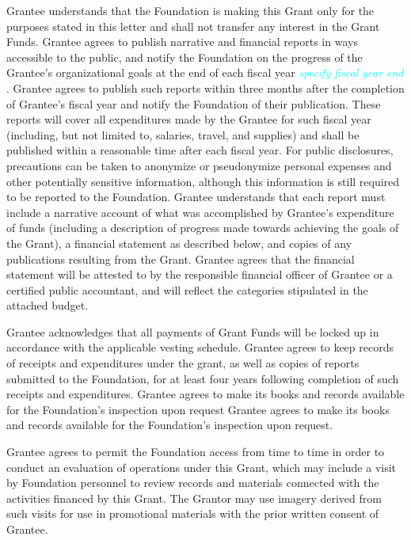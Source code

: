 \documentclass{article}
\begin{document}
Grantee understands that the Foundation is making this Grant only for the purposes stated in this letter and shall not transfer any interest in the Grant Funds. Grantee agrees to publish narrative and financial reports in ways accessible to the public, and notify the Foundation on the progress of the Grantee’s organizational goals at the end of each fiscal year \textcolor{cyan}{\emph{specify fiscal year end}} . Grantee agrees to publish such reports within three months after the completion of Grantee’s fiscal year and notify the Foundation of their publication.  These  reports will cover all expenditures made by the Grantee for such fiscal year (including, but not limited to, salaries, travel, and supplies) and shall be published within a reasonable time after each fiscal year. For public disclosures, precautions can be taken to anonymize or pseudonymize personal expenses and other potentially sensitive information, although this information is still required to be reported to the Foundation.  Grantee understands that each report must include a narrative account of what was accomplished by Grantee’s expenditure of funds (including a description of progress made towards achieving the goals of the Grant), a financial statement as described below, and copies of any publications resulting from the Grant. Grantee agrees that the financial statement will be attested to by the responsible financial officer of Grantee or a certified public accountant, and will reflect the categories stipulated in the attached budget. 
\par
Grantee acknowledges that all payments of Grant Funds will be locked up in accordance with the applicable vesting schedule. Grantee agrees to keep records of receipts and expenditures under the grant, as well as copies of reports submitted to the Foundation, for at least four years following completion of such receipts and expenditures. Grantee agrees to make its books and records available for the Foundation’s inspection upon request Grantee agrees to make its books and records available for the Foundation’s inspection upon request.
\par
Grantee agrees to permit the Foundation access from time to time in order to conduct an evaluation of operations under this Grant, which may include a visit by Foundation personnel to review records and materials connected with the activities financed by this Grant. The Grantor may use imagery derived from such visits for use in promotional materials with the prior written consent of Grantee.
\par
\end{document}
